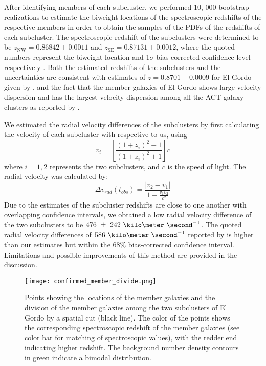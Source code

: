 After identifying members of each subcluster, we performed 10, 000 bootstrap realizations to estimate the biweight
locations of the spectroscopic redshifts of the respective members in order
to obtain the
samples of the PDFs of the redshifts of each subcluster. 
The spectroscopic redshift of the subclusters were
determined to be 
$z_{\mathrm{NW}} = 0.86842 \pm 0.0011$ and 
$z_{\mathrm{SE}} = 0.87131 \pm 0.0012$, where the quoted numbers represent the
biweight location and 1$\sigma$ bias-corrected confidence level
respectively \citep{Beers90}.  
Both the estimated redshifts of the subclusters and the uncertainties are
consistent with estimates of $z=0.8701 \pm 0.0009$ for El Gordo given by \citealt{Sifon13}, and the fact that the
member galaxies of El
Gordo shows large velocity dispersion and has the largest velocity
dispersion among all the ACT galaxy clusters as reported by
.

We estimated the radial velocity differences of the
subclusters by first calculating the velocity of each subcluster with
respective to us, using  
\begin{equation}
	v_i = \left[ \frac{(1+z_i)^2 - 1 }{(1+z_i)^2 + 1 }\right]c
\end{equation}
where $i=1, 2$ represents the two subclusters, and $c$ is the speed of
light. The radial velocity was calculated by: 
\begin{equation}
	\Delta v_{rad}(t_{obs}) = \frac{|v_2 - v_1|}{1-\frac{v_1 v_2}{c^2}}
\end{equation}
Due to the estimates of the subcluster redshifts are close to
one another with overlapping confidence intervals, we obtained a low 
radial velocity difference of the two subclusters to be
$476~\pm~242~\kilo\meter~\second^{-1}$. 
The quoted radial velocity differences of $586~\kilo \meter~\second^{-1}$ reported by  
is higher than our estimates but within the 68\% bias-corrected
confidence interval. Limitations and possible improvements of this method
are provided in the discussion. 

\begin{figure}
	\texttt{[image: confirmed\_member\_divide.png]}
	\caption{\label{fig:membership} Points showing the locations of the
	member galaxies and the division of the member galaxies among the two subclusters of El Gordo by a spatial cut
(black line). The color of the points shows the corresponding spectroscopic
redshift of the member galaxies (see color bar for matching of
spectroscopic values), with the redder end indicating higher
redshift. The background number density contours in green indicate a bimodal
distribution.} 
\end{figure}

